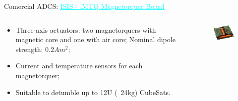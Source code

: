\documentclass{beamer}
\begin{document}

\begin{frame}{Comercial ADCS: \href{https://www.isispace.nl/product/isis-magnetorquer-board/}{\textcolor{cyan}{\underline{ISIS - iMTQ Magnetorquer Board}}}}

    \begin{columns}[t]
        \begin{column}[t]{0.5\textwidth}
            \begin{itemize}
                \item Three-axis actuators: two magnetorquers with magnetic core and one with air core; Nominal dipole strength: $0.2 Am^2$;
                \item Current and temperature sensors for each magnetorquer;
                \item Suitable to detumble up to 12U (~24kg) CubeSats.
            \end{itemize}
        \end{column}
        \begin{column}[t]{0.5\textwidth}
            \begin{figure}[!ht]
                \begin{center}
                    \includegraphics[width=4.5cm]{figures/magnetorquers-isis.png}
                \end{center}
            \end{figure}
        \end{column}
    \end{columns}

    

    
\end{frame}
\end{document}
